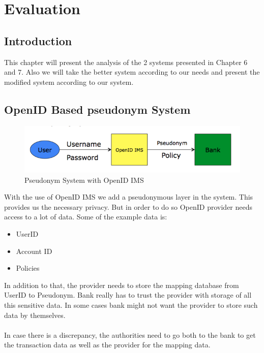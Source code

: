 \chapter{Evaluation}
\section{Introduction}
This chapter will present the analysis of the 2 systems presented in Chapter 6 and 7. Also we will take the better system according to our needs and present the modified system according to our system.
\section{OpenID Based pseudonym System}
\begin{figure}[h]
	\centering
	\includegraphics[width=\textwidth]{figures/OpenID}
	\caption{Pseudonym System with OpenID IMS}
	\label{fig:OpenID}
\end{figure}
With the use of OpenID IMS we add a pseudonymous layer in the system. This provides us the necessary privacy. But in order to do so OpenID provider needs access to a lot of data. Some of the example data is:
\begin{itemize}
\item UserID
\item Account ID 
\item Policies	
\end{itemize}
In addition to that, the provider needs to store the mapping database from UserID to Pseudonym. Bank really has to trust the provider with storage of all this sensitive data. In some cases bank might not want the provider to store such data by themselves.
\\
\\In case there is a discrepancy, the authorities need to go both to the bank to get the transaction data as well as the provider for the mapping data.
